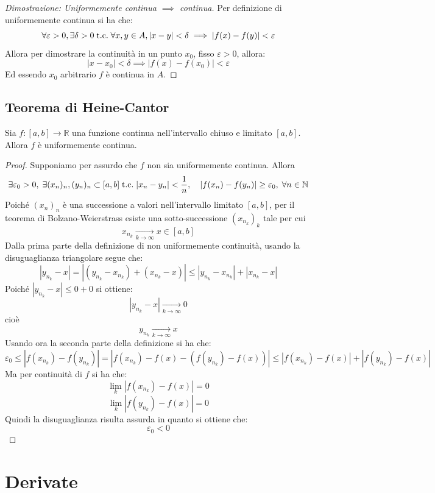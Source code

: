 \documentclass[a4paper,12pt,openright]{book}
\begin{document}
    \begin{proof}[Dimostrazione: Uniformemente continua $\implies$ continua]
    	Per definizione di uniformemente continua si ha che:
    	\[\forall \varepsilon > 0, \exists \delta > 0 \;\text{t.c.}\; \forall x, y \in A, |x- y| < \delta \implies |f(x) - f(y)| < \varepsilon\]
    	Allora per dimostrare la continuità in un punto $x_0$, fisso $\varepsilon > 0$, allora:
    	\[|x - x_0| < \delta \implies |f(x) - f(x_0)| < \varepsilon\]
    	Ed essendo $x_0$ arbitrario $f$ è continua in $A$.
    \end{proof}
    
    \section{Teorema di Heine-Cantor}
    Sia $f: [a, b] \longrightarrow \mathbb{R}$ una funzione continua nell'intervallo chiuso e limitato $[a, b]$. Allora $f$ è uniformemente continua.
    
    \begin{proof} Supponiamo per assurdo che $f$ non sia uniformemente continua. Allora
    	\[\exists \varepsilon_0 > 0, \; \exists (x_n)_n,(y_n)_n \subset [a,b] \;\text{t.c.}\; |x_n - y_n| < \frac{1}{n}, \quad |f(x_n) - f(y_n)| \geq \varepsilon_0, \; \forall n \in \mathbb{N}\]
    	Poiché $(x_n)_n$ è una successione a valori nell'intervallo limitato $[a,b]$, per il teorema di Bolzano-Weierstrass esiste una sotto-successione $(x_{n_k})_k$ tale per cui
    	\[x_{n_k} \xrightarrow[k\to\infty]{} x \in [a,b]\]
    	Dalla prima parte della definizione di non uniformemente continuità, usando la disuguaglianza triangolare segue che:
    	\[|y_{n_k} - x|	= |(y_{n_k} - x_{n_k}) + (x_{n_k} - x)|	\le |y_{n_k} - x_{n_k}| + |x_{n_k} - x|\]
    	Poiché $|y_{n_k} - x| \le 0 + 0$ si ottiene:
    	\[|y_{n_k} - x| \xrightarrow[k\to\infty]{} 0\]
    	cioè
    	\[y_{n_k} \xrightarrow[k\to\infty]{} x\]
    	Usando ora la seconda parte della definizione si ha che:
    	\[\varepsilon_0 \leq |f(x_{n_k}) - f(y_{n_k})| = |f(x_{n_k}) - f(x) - (f(y_{n_k}) - f(x))| \leq |f(x_{n_k}) - f(x)| + |f(y_{n_k}) - f(x)|\] 
    	Ma per continuità di $f$ si ha che:
    	\[\lim_{k} |f(x_{n_k}) - f(x)| = 0\]
    	\[\lim_{k} |f(y_{n_k}) - f(x)| = 0\]
    	Quindi la disuguaglianza risulta assurda in quanto si ottiene che:
    	\[\varepsilon_0 < 0\]
    \end{proof}
    
    \chapter{Derivate}
\end{document}
